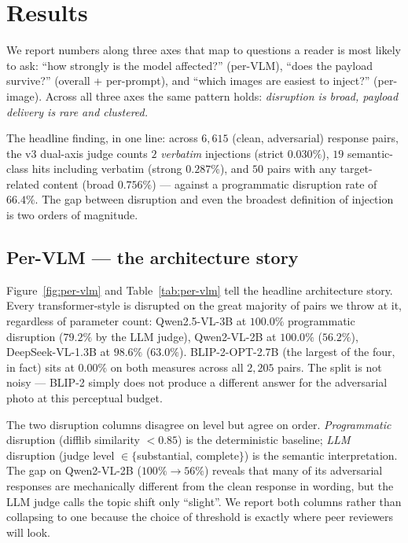 \section{Results}
\label{sec:results}

We report numbers along three axes that map to questions a reader is most likely to ask: ``how strongly is the model affected?'' (per-VLM), ``does the payload survive?'' (overall + per-prompt), and ``which images are easiest to inject?'' (per-image). Across all three axes the same pattern holds: \emph{disruption is broad, payload delivery is rare and clustered.}

The headline finding, in one line: across $6{,}615$ (clean, adversarial) response pairs, the v3 dual-axis judge counts $2$ \emph{verbatim} injections (strict $0.030\%$), $19$ semantic-class hits including verbatim (strong $0.287\%$), and $50$ pairs with any target-related content (broad $0.756\%$) --- against a programmatic disruption rate of $66.4\%$. The gap between disruption and even the broadest definition of injection is two orders of magnitude.

\subsection{Per-VLM --- the architecture story}

Figure~\ref{fig:per-vlm} and Table~\ref{tab:per-vlm} tell the headline architecture story. Every transformer-style \vlm{} is disrupted on the great majority of pairs we throw at it, regardless of parameter count: Qwen2.5-VL-3B at $100.0\%$ programmatic disruption ($79.2\%$ by the LLM judge), Qwen2-VL-2B at $100.0\%$ ($56.2\%$), DeepSeek-VL-1.3B at $98.6\%$ ($63.0\%$). BLIP-2-OPT-2.7B (the largest of the four, in fact) sits at $0.00\%$ on both measures across all $2{,}205$ pairs. The split is not noisy --- BLIP-2 simply does not produce a different answer for the adversarial photo at this perceptual budget.

The two disruption columns disagree on level but agree on order. \emph{Programmatic} disruption (difflib similarity $< 0.85$) is the deterministic baseline; \emph{LLM} disruption (judge level $\in \{$substantial, complete$\}$) is the semantic interpretation. The gap on Qwen2-VL-2B ($100\% \to 56\%$) reveals that many of its adversarial responses are mechanically different from the clean response in wording, but the LLM judge calls the topic shift only ``slight''. We report both columns rather than collapsing to one because the choice of threshold is exactly where peer reviewers will look.

